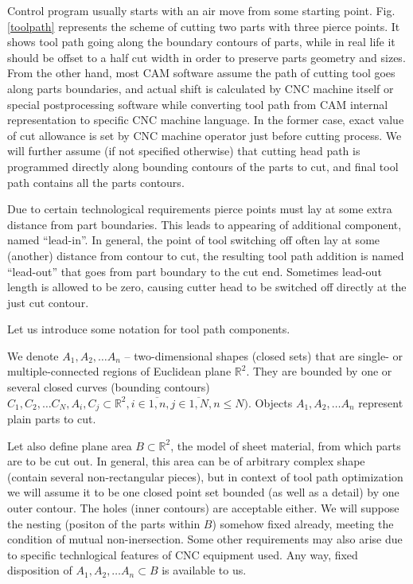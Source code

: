 \documentclass{../download/tPRS2e}
\begin{document}
Control program usually starts with an air move from
some starting point. Fig. \ref{toolpath} represents
the scheme of cutting two parts with three pierce points.
It shows tool path going
along the boundary contours of parts,
while in real life it should be offset to
a half cut width in order to preserve parts geometry and sizes.
From the other hand,
most CAM software assume
the path of cutting tool goes
along parts boundaries,
and actual shift is calculated
by CNC machine itself
or special postprocessing software
while converting tool path
from CAM internal representation
to specific CNC machine language.
In the former case,
exact value of cut allowance
is set by CNC machine operator
just before cutting process.
We will further assume
(if not specified otherwise)
that cutting head path is programmed
directly along bounding contours of the parts to cut,
and final tool path contains all the parts contours.

Due to certain technological requirements
pierce points must lay at some extra distance
from part boundaries.
This leads to appearing of additional component,
named ``lead-in''.
In general,
the point of tool switching off
often lay at some
(another) distance from contour to cut,
the resulting tool path addition
is named ``lead-out''
that goes from part boundary to the cut end.
Sometimes lead-out length is allowed to be zero,
causing cutter head to be switched off
directly at the just cut contour.

Let us introduce some notation for tool path components.

We denote $A_1, A_2, \dots A_n$ -- two-dimensional shapes
(closed sets)
that are single- or multiple-connected
regions of Euclidean plane
$\mathbb R^2$.
They are bounded by one or several closed curves
(bounding contours)
$C_1, C_2, \dots C_N,
A_i, C_j \subset \mathbb R^2,
i \in \overline{1, n},
j \in \overline{1, N},
n \leqslant N)$.
Objects $A_1, A_2, \dots A_n$
represent plain parts to cut.

Let also define plane area
$B \subset \mathbb R^2$,
the model of 
sheet material, from which parts are to be cut out.
In general,
this area can be of arbitrary complex shape
(contain several non-rectangular pieces),
but in context of tool path optimization
we will assume it to be
one closed point set bounded
(as well as a detail) by one outer contour.
The holes
(inner contours) are acceptable either.
We will suppose the nesting
(positon of the parts within $B$)
somehow fixed already,
meeting the condition of
mutual non-inersection.
Some other requirements may also arise
due to specific technlogical features
of CNC equipment used.
Any way,
fixed disposition of
$A_1, A_2, \dots A_n \subset B$
is available to us.
\end{document}
